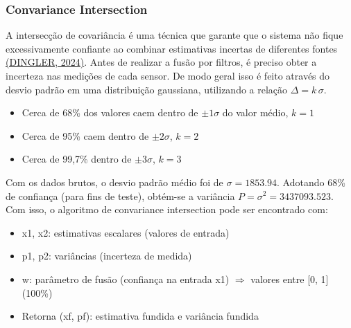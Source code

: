 \documentclass[a4paper, 12pt]{article}
\begin{document}
        \subsubsection{Convariance Intersection}
            A intersecção de covariância é uma técnica que garante que o sistema não fique excessivamente confiante ao combinar estimativas incertas de diferentes fontes \hyperlink{DINGLER}{(DINGLER, 2024)}. Antes de realizar a fusão por filtros, é preciso obter a incerteza nas medições de cada sensor. De modo geral isso é feito através do desvio padrão em uma distribuição gaussiana, utilizando a relação $\varDelta = k\,\sigma$.
            \vspace{-.15cm}
    
            \begin{itemize}
                \item Cerca de 68\% dos valores caem dentro de $\pm 1\sigma$ do valor médio, $k=1$\vspace{-.2cm}
                \item Cerca de 95\% caem dentro de $\pm 2\sigma$, $k=2$\vspace{-.2cm}
                \item Cerca de 99,7\% dentro de $\pm 3\sigma$, $k=3$
            \end{itemize}
            \vspace{-0.15cm}

            Com os dados brutos, o desvio padrão médio foi de $\sigma = 1853.94$. Adotando 68\% de confiança (para fins de teste), obtém-se a variância $P = \sigma^2 = 3437093.523$. Com isso, o algoritmo de convariance intersection pode ser encontrado com:
            \vspace{-0.15cm}
    
            \begin{itemize}
                \item x1, x2: estimativas escalares (valores de entrada)\vspace{-.2cm}
                \item p1, p2: variâncias (incerteza de medida)\vspace{-.2cm}
                \item w: parâmetro de fusão (confiança na entrada x1) $\Rightarrow$ valores entre [0, 1] (100\%)\vspace{-.2cm}
                \item Retorna (xf, pf): estimativa fundida e variância fundida
            \end{itemize}
\end{document}
